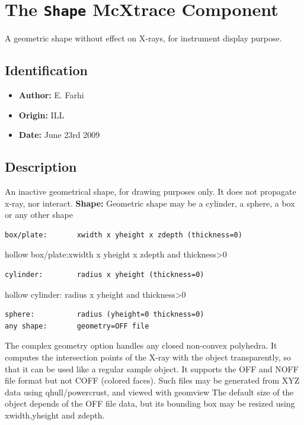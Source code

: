 \section{The \texttt{Shape} McXtrace Component}
A geometric shape without effect on X-rays, for instrument display purpose.

\subsection*{Identification}
\begin{itemize}
  \item \textbf{Author:} E. Farhi
  \item \textbf{Origin:} ILL
  \item \textbf{Date:} June 23rd 2009
\end{itemize}

\subsection*{Description}
An inactive geometrical shape, for drawing purposes only. It does not propagate x-ray, nor interact. \textbf{Shape:} Geometric shape may be a cylinder, a sphere, a box or any other shape

\begin{verbatim}
box/plate:       xwidth x yheight x zdepth (thickness=0)
\end{verbatim}

hollow box/plate:xwidth x yheight x zdepth and thickness\textgreater{}0

\begin{verbatim}
cylinder:        radius x yheight (thickness=0)
\end{verbatim}

hollow cylinder: radius x yheight and thickness\textgreater{}0

\begin{verbatim}
sphere:          radius (yheight=0 thickness=0)
any shape:       geometry=OFF file
\end{verbatim}

The complex geometry option handles any closed non-convex polyhedra. It computes the intersection points of the X-ray with the object transparently, so that it can be used like a regular sample object. It supports the OFF and NOFF file format but not COFF (colored faces). Such files may be generated from XYZ data using qhull/powercrust, and viewed with geomview The default size of the object depends of the OFF file data, but its bounding box may be resized using xwidth,yheight and zdepth.

